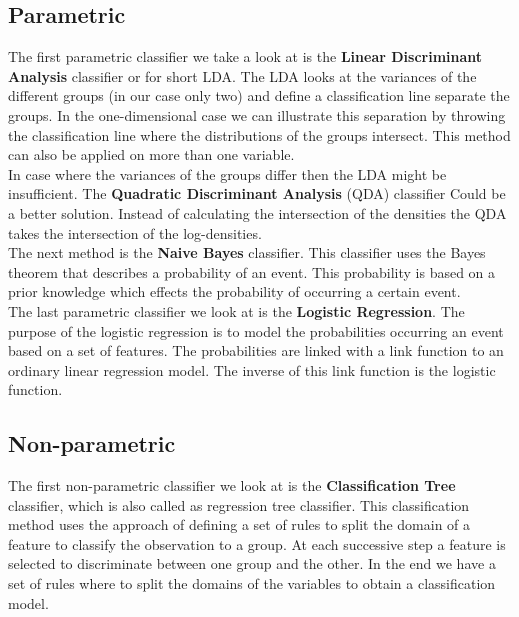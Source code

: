 \documentclass{seal_thesis}
\begin{document}
\subsection{Parametric}
\noindent The first parametric classifier we take a look at is the \textbf{Linear Discriminant Analysis} classifier or for short LDA. The LDA looks at the variances of the different groups (in our case only two) and define a classification line  separate the groups. In the one-dimensional case we can illustrate this separation by throwing the classification line where the  distributions of the groups intersect. This method can also be applied on more  than one variable. \\

\noindent In case where the variances of the groups  differ  then the LDA might be insufficient. The \textbf{Quadratic Discriminant Analysis} (QDA) classifier Could be a better solution. Instead of calculating the intersection of the densities the QDA takes the intersection of the log-densities. \\

\noindent The next method is the \textbf{Naive Bayes} classifier. This classifier uses the Bayes theorem that describes a probability of an event. This probability is based on a prior knowledge which effects the probability of  occurring  a certain event. \\

\noindent The last parametric classifier we look at is the \textbf{Logistic Regression}.  The purpose of the logistic regression is to model the probabilities occurring an event based on a set of features. The probabilities are linked with a link function to an ordinary linear regression model. The inverse of this link function is the logistic function. \\

\subsection{Non-parametric}
\noindent The first non-parametric classifier we look at is the \textbf{Classification Tree} classifier, which is also called as regression tree classifier. This classification method uses the approach of defining a set of rules to split the domain of a feature to classify  the observation to a group. At each successive step a feature is selected to discriminate between one group and the other. In the end we have a set of rules where to split the domains of the variables to obtain a classification model. \\
\end{document}
